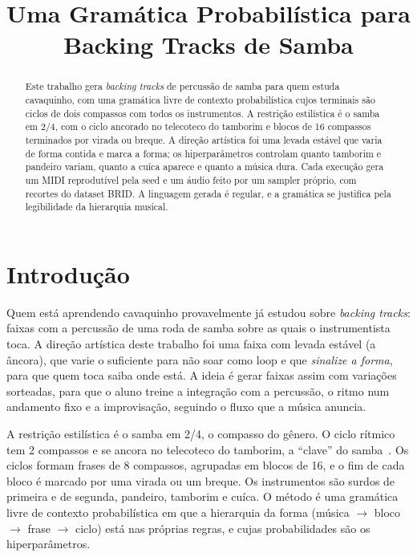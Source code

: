 \documentclass{article}
\title{Uma Gramática Probabilística para Backing Tracks de Samba}
\begin{document}
\maketitle

\begin{abstract}
Este trabalho gera \emph{backing tracks} de percussão de samba para quem estuda cavaquinho,
com uma gramática livre de contexto probabilística cujos terminais são ciclos de dois
compassos com todos os instrumentos. A restrição estilística é o samba em 2/4, com o ciclo
ancorado no telecoteco do tamborim e blocos de 16 compassos terminados por virada ou breque. A direção artística foi uma levada estável que varia de
forma contida e marca a forma; os hiperparâmetros controlam quanto tamborim e pandeiro
variam, quanto a cuíca aparece e quanto a música dura. Cada execução gera um MIDI
reprodutível pela seed e um áudio feito por um sampler próprio, com recortes do dataset BRID. A linguagem gerada é regular, e a gramática se
justifica pela legibilidade da hierarquia musical.
\end{abstract}

\section{Introdução}\label{sec:introducao}

Quem está aprendendo cavaquinho provavelmente já estudou sobre \emph{backing tracks}: faixas
com a percussão de uma roda de samba sobre as quais o instrumentista toca. A direção artística deste trabalho foi uma faixa com levada estável (a âncora), que
varie o suficiente para não soar como loop e que \emph{sinalize a forma}, para que quem toca
saiba onde está. A ideia é gerar faixas assim com variações sorteadas, para que o aluno
treine a integração com a percussão, o ritmo num andamento fixo e a improvisação, seguindo o
fluxo que a música anuncia.

A restrição estilística é o samba em 2/4, o compasso do gênero. O ciclo rítmico tem 2
compassos e se ancora no telecoteco do tamborim, a ``clave'' do samba~\cite{sandroni2001}.
Os ciclos formam frases de 8 compassos, agrupadas em blocos de 16, e o fim de cada bloco é
marcado por uma virada ou um breque. Os instrumentos são surdos de primeira e de segunda,
pandeiro, tamborim e cuíca. O método é uma gramática livre de contexto probabilística em que a hierarquia da forma
(música $\to$ bloco $\to$ frase $\to$ ciclo) está nas próprias regras, e cujas
probabilidades são os hiperparâmetros.
\end{document}
